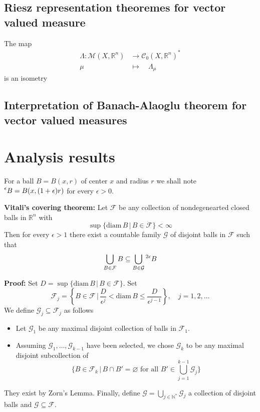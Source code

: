 \documentclass{article}
\begin{document}
\subsection{Riesz representation theoremes for vector valued measure}
The map
\begin{align*}
    \Lambda:\mathcal{M}(X, \mathbb{R}^n)&\rightarrow\mathcal{C}_0(X,\mathbb{R}^n)^*\\
    \mu\quad&\mapsto\quad\Lambda_\mu
\end{align*}
is an isometry

\subsection{Interpretation of Banach-Alaoglu theorem for vector valued measures}

\section{Analysis results}

For a ball $B=B(x, r)$ of center $x$ and radius $r$ we shall note $\prescript{\epsilon}{}B
=B(x, (1+\epsilon)r)$ for every $\epsilon>0$.

\vspace{1ex}
\textbf{Vitali's covering theorem:}
Let $\mathcal{F}$ be any collection of nondegenearted closed balls in
$\mathbb{R}^n$ with
\[ \sup\{\text{diam}\,B\,|\, B\in\mathcal{F}\}<\infty \]
Then for every $\epsilon>1$ there exist a countable family $\mathcal{G}$ of
disjoint balls in $\mathcal{F}$ such that
\[\bigcup_{B\in\mathcal{F}}B\subseteq\bigcup_{B\in\mathcal{G}}\prescript{2\epsilon}{}B\]

\vspace{1ex}
\textbf{Proof:}
Set $D=\sup\{\text{diam}\,B\,|\,B\in \mathcal{F}\}$. Set
\[\mathcal{F}_j=\left\{B\in\mathcal{F}\,|\,\frac{D}{\epsilon^j}<\text{diam}\,B\leq\frac{D}{\epsilon^{j-1}}\right\},\quad j=1,2,\ldots\]
We define $\mathcal{G}_j\subseteq\mathcal{F}_j$ as follows
\begin{itemize}
    \item Let $\mathcal{G}_1$ be any maximal disjoint collection of balls in
        $\mathcal{F}_1$.

    \item Assuming $\mathcal{G}_1,\ldots,\mathcal{G}_{k-1}$ have been selected,
        we chose $\mathcal{G}_k$ to be any maximal disjoint subcollection of
        \[ \{B\in\mathcal{F}_k\,|\,B\cap B'=\varnothing\text{ for all }B'\in\bigcup_{j=1}^{k-1}\mathcal{G}_j\}\]
\end{itemize}
They exist by Zorn's Lemma. Finally, define $\mathcal{G}=\bigcup_{j\in\mathbb{N}^*}\mathcal{G}_j$
a collection of disjoint balls and $\mathcal{G}\subseteq\mathcal{F}$.
\end{document}
